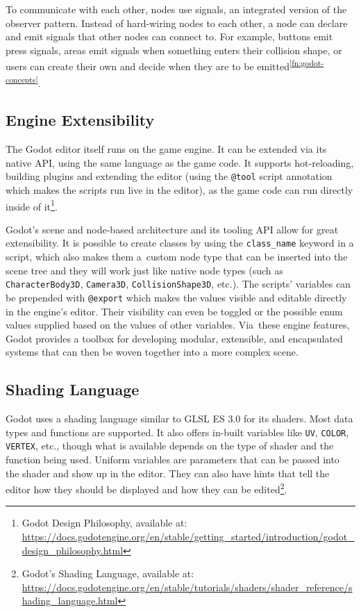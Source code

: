 To communicate with each other, nodes use signals, an integrated version of the observer pattern. Instead of hard-wiring nodes to each other, a node can declare and emit signals that other nodes can connect to. For example, buttons emit press signals, areas emit signals when something enters their collision shape, or users can create their own and decide when they are to be emitted\textsuperscript{\ref{fn:godot-concepts}}.


\subsection{Engine Extensibility}
The Godot editor itself runs on the game engine. It can be extended via its native API, using the same language as the game code. It supports hot-reloading, building plugins and extending the editor (using the \texttt{@tool} script annotation which makes the scripts run live in the editor), as the game code can run directly inside of it\footnote{Godot Design Philosophy, available at: \url{https://docs.godotengine.org/en/stable/getting_started/introduction/godot_design_philosophy.html}}.

Godot's scene and node-based architecture and its tooling API allow for great extensibility. It is possible to create classes by using the \texttt{class\_name} keyword in a script, which also makes them a~custom node type that can be inserted into the scene tree and they will work just like native node types (such as \texttt{CharacterBody3D}, \texttt{Camera3D}, \texttt{CollisionShape3D}, etc.). The scripts' variables can be prepended with \texttt{@export} which makes the values visible and editable directly in the engine's editor. Their visibility can even be toggled or the possible enum values supplied based on the values of other variables. Via~these engine features, Godot provides a toolbox for developing modular, extensible, and encapsulated systems that can then be woven together into a more complex scene.

\subsection{Shading Language}
Godot uses a shading language similar to GLSL ES 3.0 for its shaders. Most data types and functions are supported.
It also offers in-built variables like \texttt{UV}, \texttt{COLOR}, \texttt{VERTEX}, etc., though what is available depends on the type of shader and the function being used. Uniform variables are parameters that can be passed into the shader and show up in the editor. They can also have hints that tell the editor how they should be displayed and how they can be edited\footnote{Godot's Shading Language, available at: \url{https://docs.godotengine.org/en/stable/tutorials/shaders/shader_reference/shading_language.html}}.


